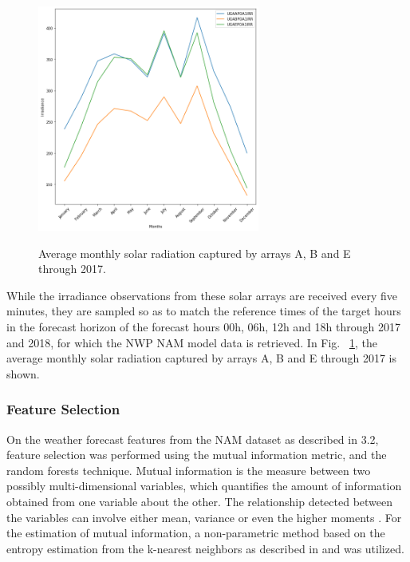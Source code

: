 \begin{figure}[htbp]
    \begin{center}
    	\includegraphics[width=0.65\textwidth]{chapter3/fig_average_irradiance.png}
    	\label{fig:fig_average_irradiance}
    	\caption[Average monthly solar radiation captured by arrays A, B and E through 2017.]{Average monthly solar radiation captured by arrays A, B and E through 2017.}
    \end{center}
\end{figure}

While the irradiance observations from these solar arrays are received every five minutes, they are sampled so as to match the reference times of the target hours in the forecast horizon of the forecast hours 00h, 06h, 12h and 18h through 2017 and 2018, for which the NWP NAM model data is retrieved. In Fig. ~\ref{fig:fig_average_irradiance}, the average monthly solar radiation captured by arrays A, B and E through 2017 is shown.

\subsubsection*{Feature Selection}
On the weather forecast features from the NAM dataset as described in 3.2, feature selection was performed using the mutual information metric, and the random forests technique. Mutual information is the measure between two possibly multi-dimensional variables, which quantifies the amount of information obtained from one variable about the other. The relationship detected between the variables can involve either mean, variance or even the higher moments \cite{feature_selection_mi}. For the estimation of mutual information, a non-parametric method based on the entropy estimation from the k-nearest neighbors as described in \cite{feature_selection_mi} and \cite{feature_selection_mi2} was utilized. 

